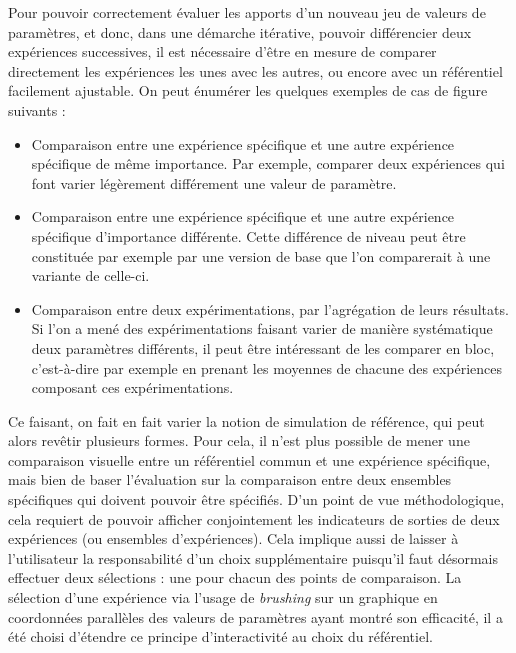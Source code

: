 Pour pouvoir correctement évaluer les apports d'un nouveau jeu de valeurs de paramètres, et donc, dans une démarche itérative, pouvoir différencier deux expériences successives, il est nécessaire d'être en mesure de comparer directement les expériences les unes avec les autres, ou encore avec un référentiel facilement ajustable.
On peut énumérer les quelques exemples de cas de figure suivants :
\begin{itemize}
	\item Comparaison entre une expérience spécifique et une autre expérience spécifique de même \og importance\fg{}.
	Par exemple, comparer deux expériences qui font varier légèrement différement une valeur de paramètre.
	\item Comparaison entre une expérience spécifique et une autre expérience spécifique d'\og importance\fg{} différente.
	Cette différence de niveau peut être constituée par exemple par une version \og de base\fg{} que l'on comparerait à une variante de celle-ci.
	\item Comparaison entre deux expérimentations, par l'agrégation de leurs résultats.
	Si l'on a mené des expérimentations faisant varier de manière systématique deux paramètres différents, il peut être intéressant de les comparer en bloc, c'est-à-dire par exemple en prenant les moyennes de chacune des expériences composant ces expérimentations.
\end{itemize}

Ce faisant, on fait en fait varier la notion de \og simulation de référence\fg{}, qui peut alors revêtir plusieurs formes.
Pour cela, il n'est plus possible de mener une comparaison visuelle entre un référentiel commun et une expérience spécifique, mais bien de baser l'évaluation sur la comparaison entre deux ensembles spécifiques qui doivent pouvoir être spécifiés.
D'un point de vue méthodologique, cela requiert de pouvoir afficher conjointement les indicateurs de sorties de deux expériences (ou ensembles d'expériences).
Cela implique aussi de laisser à l'utilisateur la responsabilité d'un choix supplémentaire puisqu'il faut désormais effectuer deux sélections : une pour chacun des points de comparaison.
La sélection d'une expérience via l'usage de \textit{brushing} sur un graphique en coordonnées parallèles des valeurs de paramètres ayant montré son efficacité, il a été choisi d'étendre ce principe d'interactivité au choix du référentiel.

